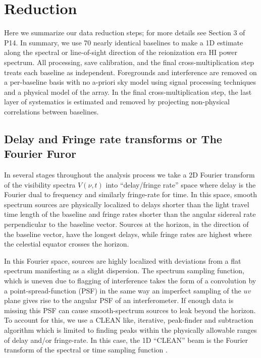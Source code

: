 \documentclass[preprint]{aastex}
\begin{document}
\section{Reduction}
\label{sec:obs_meth}
Here we summarize our data reduction steps; for more details see Section 3 of P14.  In summary, we use 70 nearly identical baselines to make a 1D estimate along the spectral or line-of-sight direction of the reionization era HI power spectrum.  All processing, save calibration, and  the final cross-multiplication step treats each baseline as independent. Foregrounds and interference are removed on a per-baseline basis with no a-priori sky model using signal processing techniques and a physical model of the array. In the final cross-multiplication step, the last layer of systematics is estimated and removed by projecting non-physical correlations between baselines.
\subsection{Delay and Fringe rate transforms or The Fourier Furor}
\label{sec:transforms}
In several stages throughout the analysis process we take a 2D Fourier transform of the visibility spectra $V(\nu,t)$ into ``delay/fringe rate'' space where delay is the Fourier dual to frequency and similarly fringe-rate for time.  In this space, smooth spectrum sources are physically localized to delays shorter than the light travel time length of the baseline and fringe rates shorter than the angular sidereal rate perpendicular to the baseline vector. Sources at the horizon, in the direction of the baseline vector, have the longest delays, while fringe rates are highest where the celestial equator crosses the horizon. 


 In this Fourier space, sources are highly localized with deviations from a flat spectrum manifesting as a slight dispersion. The spectrum sampling function, which is uneven due to flagging of interference takes the form of a convolution by a point-spread-function (PSF) in the same way an imperfect sampling of the $uv$ plane gives rise to the angular PSF of an interferometer.  If enough data is missing this PSF can cause smooth-spectrum sources to leak beyond the horizon.  To account for this, we use a CLEAN like, iterative, peak-finder and subtraction algorithm which is limited to finding peaks within the physically allowable ranges of delay and/or fringe-rate. In this case, the 1D ``CLEAN'' beam is the Fourier transform of the spectral or time sampling function \citep{Parsons:2009p7859}.
\end{document}
